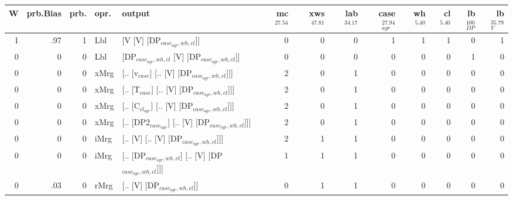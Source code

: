 \begin{tabularx}{\linewidth}{rrrlXrrrrrrrr}
\hline
   W &   prb.Bias &   prb. & opr.   & output                                                &   mc$^{27.54}$ &   xws$^{47.81}$ &   lab$^{34.17}$ &   case$_{agr}^{27.94}$ &   wh$^{5.40}$ &   cl$^{5.40}$ &   lb$_{DP}^{100}$ &   lb$_{V}^{35.79}$ \\
\hline
   1 &       .97 &   1 & Lbl  & [V [V] [DP$_{case_{agr},wh,cl}$]]                           &            0 &             0 &             0 &                  1 &           1 &           1 &                0 &              1 \\
   0 &       0 &   0 & Lbl  & [DP$_{case_{agr},wh,cl}$ [V] [DP$_{case_{agr},wh,cl}$]]           &            0 &             0 &             0 &                  0 &           0 &           0 &                1 &              0 \\
   0 &       0 &   0 & xMrg & [.. [v$_{case}$] [.. [V] [DP$_{case_{agr},wh,cl}$]]]            &            2 &             0 &             1 &                  0 &           0 &           0 &                0 &              0 \\
   0 &       0 &   0 & xMrg & [.. [T$_{case}$] [.. [V] [DP$_{case_{agr},wh,cl}$]]]            &            2 &             0 &             1 &                  0 &           0 &           0 &                0 &              0 \\
   0 &       0 &   0 & xMrg & [.. [C$_{cl_{agr}}$] [.. [V] [DP$_{case_{agr},wh,cl}$]]]          &            2 &             0 &             1 &                  0 &           0 &           0 &                0 &              0 \\
   0 &       0 &   0 & xMrg & [.. [DP2$_{case_{agr}}$] [.. [V] [DP$_{case_{agr},wh,cl}$]]]      &            2 &             0 &             1 &                  0 &           0 &           0 &                0 &              0 \\
   0 &       0 &   0 & iMrg & [.. [V] [.. [V] [DP$_{case_{agr},wh,cl}$]]]                 &            2 &             1 &             1 &                  0 &           0 &           0 &                0 &              0 \\
   0 &       0 &   0 & iMrg & [.. [DP$_{case_{agr},wh,cl}$] [.. [V] [DP$_{case_{agr},wh,cl}$]]] &            1 &             1 &             1 &                  0 &           0 &           0 &                0 &              0 \\
   0 &       .03 &   0 & rMrg & [.. [V] [DP$_{case_{agr},wh,cl}$]]                          &            0 &             1 &             1 &                  0 &           0 &           0 &                0 &              0 \\
\hline
\end{tabularx}\endgroup\\

